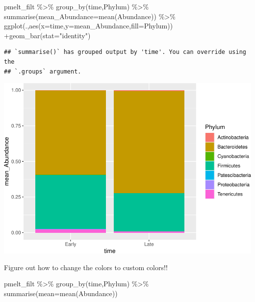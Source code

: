 \documentclass[
]{book}
\newenvironment{Shaded}{\begin{snugshade}}{\end{snugshade}}
\newcommand{\AttributeTok}[1]{\textcolor[rgb]{0.77,0.63,0.00}{#1}}
\newcommand{\FunctionTok}[1]{\textcolor[rgb]{0.00,0.00,0.00}{#1}}
\newcommand{\NormalTok}[1]{#1}
\newcommand{\SpecialCharTok}[1]{\textcolor[rgb]{0.00,0.00,0.00}{#1}}
\newcommand{\StringTok}[1]{\textcolor[rgb]{0.31,0.60,0.02}{#1}}
\begin{document}
\begin{Shaded}
\begin{Highlighting}[]
\NormalTok{pmelt\_filt }\SpecialCharTok{\%\textgreater{}\%} \FunctionTok{group\_by}\NormalTok{(time,Phylum) }\SpecialCharTok{\%\textgreater{}\%} \FunctionTok{summarise}\NormalTok{(}\AttributeTok{mean\_Abundance=}\FunctionTok{mean}\NormalTok{(Abundance)) }\SpecialCharTok{\%\textgreater{}\%} \FunctionTok{ggplot}\NormalTok{(.,}\FunctionTok{aes}\NormalTok{(}\AttributeTok{x=}\NormalTok{time,}\AttributeTok{y=}\NormalTok{mean\_Abundance,}\AttributeTok{fill=}\NormalTok{Phylum)) }\SpecialCharTok{+}\FunctionTok{geom\_bar}\NormalTok{(}\AttributeTok{stat=}\StringTok{"identity"}\NormalTok{)}
\end{Highlighting}
\end{Shaded}

\begin{verbatim}
## `summarise()` has grouped output by 'time'. You can override using the
## `.groups` argument.
\end{verbatim}

\includegraphics{16sworkshop_files/figure-latex/unnamed-chunk-2-2.pdf}

Figure out how to change the colors to custom colors!!

\begin{Shaded}
\begin{Highlighting}[]
\NormalTok{pmelt\_filt }\SpecialCharTok{\%\textgreater{}\%} \FunctionTok{group\_by}\NormalTok{(time,Phylum) }\SpecialCharTok{\%\textgreater{}\%} \FunctionTok{summarise}\NormalTok{(}\AttributeTok{mean=}\FunctionTok{mean}\NormalTok{(Abundance))}
\end{Highlighting}
\end{Shaded}
\end{document}
